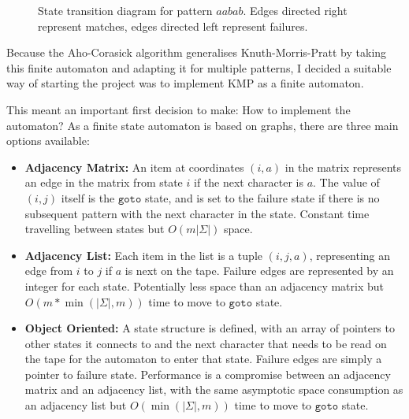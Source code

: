 \documentclass[ %
                    author={Dominic Joseph Moylett},
                    degree={MEng},
                     title={Dictionary Matching with Fingerprints},
                  subtitle={An Empirical Analysis},
                      type={Research},
                      year={2014} ]{dissertation}
\begin{document}
\begin{figure}[t]
  \centering
  \caption{State transition diagram for pattern $aabab$. Edges directed right represent matches, edges directed left represent failures.}
  \label{fig:kmp-pattern-failure}
\end{figure}

Because the Aho-Corasick algorithm generalises Knuth-Morris-Pratt by taking this finite automaton and adapting it for multiple patterns, I decided a suitable way of starting the project was to implement KMP as a finite automaton.

This meant an important first decision to make: How to implement the automaton? As a finite state automaton is based on graphs, there are three main options available:

\begin{itemize}
  \item \textbf{Adjacency Matrix:} An item at coordinates $(i,a)$ in the matrix represents an edge in the matrix from state $i$ if the next character is $a$. The value of $(i,j)$ itself is the $\texttt{goto}$ state, and is set to the failure state if there is no subsequent pattern with the next character in the state. Constant time travelling between states but $O(m|\Sigma|)$ space.
  \item \textbf{Adjacency List:} Each item in the list is a tuple $(i, j, a)$, representing an edge from $i$ to $j$ if $a$ is next on the tape. Failure edges are represented by an integer for each state. Potentially less space than an adjacency matrix but $O(m * \min(|\Sigma|, m))$ time to move to $\texttt{goto}$ state.
  \item \textbf{Object Oriented:} A state structure is defined, with an array of pointers to other states it connects to and the next character that needs to be read on the tape for the automaton to enter that state. Failure edges are simply a pointer to failure state. Performance is a compromise between an adjacency matrix and an adjacency list, with the same asymptotic space consumption as an adjacency list but $O(\min(|\Sigma|, m))$ time to move to $\texttt{goto}$ state.
\end{itemize}
\end{document}
